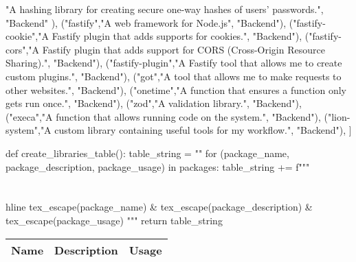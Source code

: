 \documentclass[12pt]{report}
\begin{document}
\begin{pycode}
		"A hashing library for creating secure one-way hashes of users' passwords.",
		"Backend"
	),
	("fastify","A web framework for Node.js", "Backend"),
	("fastify-cookie","A Fastify plugin that adds supports for cookies.", "Backend"),
	("fastify-cors","A Fastify plugin that adds support for CORS (Cross-Origin Resource Sharing).", "Backend"),
	("fastify-plugin","A Fastify tool that allows me to create custom plugins.", "Backend"),
	("got","A tool that allows me to make requests to other websites.", "Backend"),
	("onetime","A function that ensures a function only gets run once.", "Backend"),
	("zod","A validation library.", "Backend"),
	("execa","A function that allows running code on the system.", "Backend"),
	("lion-system","A custom library containing useful tools for my workflow.", "Backend"),
]

def create_libraries_table():
	table_string = ""
	for (package_name, package_description, package_usage) in packages:
		table_string += f"""
			\\\\\\hline
			{tex_escape(package_name)} &
			{tex_escape(package_description)} &
			{tex_escape(package_usage)}
		"""
	return table_string
\end{pycode}

\def\arraystretch{1.5}
\noindent\begin{xltabular}{\textwidth}{|
		p{0.3\textwidth\RaggedRight}|
		X|
		p{0.12\textwidth\RaggedRight}|}
	\hline
	Name &
	Description &
	Usage
	\\\hline
\end{xltabular}
\end{document}
